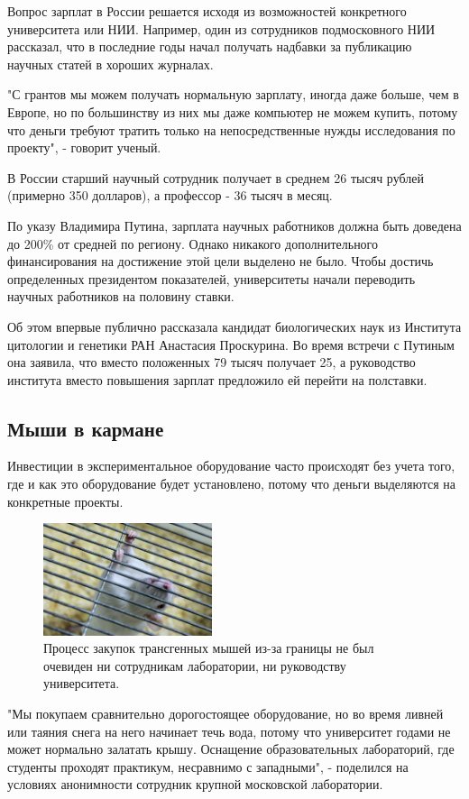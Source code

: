 Вопрос зарплат в России решается исходя из возможностей конкретного университета или НИИ. Например, один из сотрудников подмосковного НИИ рассказал, что в последние годы начал получать надбавки за публикацию научных статей в хороших журналах.

"С грантов мы можем получать нормальную зарплату, иногда даже больше, чем в Европе, но по большинству из них мы даже компьютер не можем купить, потому что деньги требуют тратить только на непосредственные нужды исследования по проекту", - говорит ученый.

В России старший научный сотрудник получает в среднем 26 тысяч рублей (примерно 350 долларов), а профессор - 36 тысяч в месяц.

По указу Владимира Путина, зарплата научных работников должна быть доведена до 200\% от средней по региону. Однако никакого дополнительного финансирования на достижение этой цели выделено не было. Чтобы достичь определенных президентом показателей, университеты начали переводить научных работников на половину ставки.

Об этом впервые публично рассказала кандидат биологических наук из Института цитологии и генетики РАН Анастасия Проскурина. Во время встречи с Путиным она заявила, что вместо положенных 79 тысяч получает 25, а руководство института вместо повышения зарплат предложило ей перейти на полставки.


\subsection{Мыши в кармане}

Инвестиции в экспериментальное оборудование часто происходят без учета того, где и как это оборудование будет установлено, потому что деньги выделяются на конкретные проекты.

\begin{figure}
    \begin{center}
        \includegraphics[width=0.44\textwidth]{img/mouse.png}
    \end{center}
    \caption{Процесс закупок трансгенных мышей из-за границы не был очевиден ни сотрудникам лаборатории, ни руководству университета.}
\end{figure}
"Мы покупаем сравнительно дорогостоящее оборудование, но во время ливней или таяния снега на него начинает течь вода, потому что университет годами не может нормально залатать крышу. Оснащение образовательных лабораторий, где студенты проходят практикум, несравнимо с западными", - поделился на условиях анонимности сотрудник крупной московской лаборатории.

